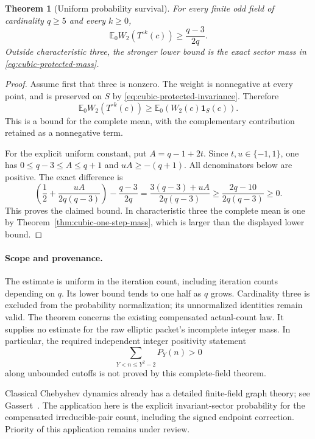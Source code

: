 \documentclass[11pt]{article}
\newtheorem{theorem}{Theorem}[section]
\begin{document}
\begin{theorem}[Uniform probability survival]
\label{thm:cubic-uniform-survival}
For every finite odd field of cardinality \(q\ge5\) and every \(k\ge0\),
\[
 \boxed{\mathbb E_0 W_2(T^{\circ k}(c))
       \ge\frac{q-3}{2q}.}
 \tag{C11}\label{eq:cubic-uniform-survival}
\]
Outside characteristic three, the stronger lower bound is the exact
sector mass in \eqref{eq:cubic-protected-mass}.
\end{theorem}
\begin{proof}
Assume first that three is nonzero.
The weight is nonnegative at every point, and is preserved on \(S\)
by \eqref{eq:cubic-protected-invariance}. Therefore
\[
 \mathbb E_0 W_2(T^{\circ k}(c))
 \ge \mathbb E_0(W_2(c)\mathbf1_S(c)).
\]
This is a bound for the complete mean, with the complementary
contribution retained as a nonnegative term.

For the explicit uniform constant, put \(A=q-1+2t\).
Since \(t,u\in\{-1,1\}\), one has
\(0\le q-3\le A\le q+1\) and \(uA\ge-(q+1)\).
All denominators below are positive. The exact difference is
\[
 \left(\frac12+\frac{uA}{2q(q-3)}\right)-\frac{q-3}{2q}
 =\frac{3(q-3)+uA}{2q(q-3)}
 \ge\frac{2q-10}{2q(q-3)}\ge0.
\]
This proves the claimed bound. In characteristic three the complete
mean is one by Theorem~\ref{thm:cubic-one-step-mass}, which is larger
than the displayed lower bound.
\end{proof}

\paragraph{Scope and provenance.}
The estimate is uniform in the iteration count, including iteration
counts depending on \(q\). Its lower bound tends to one half as
\(q\) grows. Cardinality three is excluded from the probability
normalization; its unnormalized identities remain valid.
The theorem concerns the existing compensated actual-count law.
It supplies no estimate for the raw elliptic packet's incomplete
integer mass. In particular, the required independent integer
positivity statement
\[
 \sum_{Y<n\le Y^2-2}P_Y(n)>0
\]
along unbounded cutoffs is not proved by this complete-field theorem.

Classical Chebyshev dynamics already has a detailed finite-field graph
theory; see Gassert~\cite{GassertChebyshevGraphs}.
The application here is the explicit invariant-sector probability for
the compensated irreducible-pair count, including the signed endpoint
correction. Priority of this application remains under review.
\end{document}
